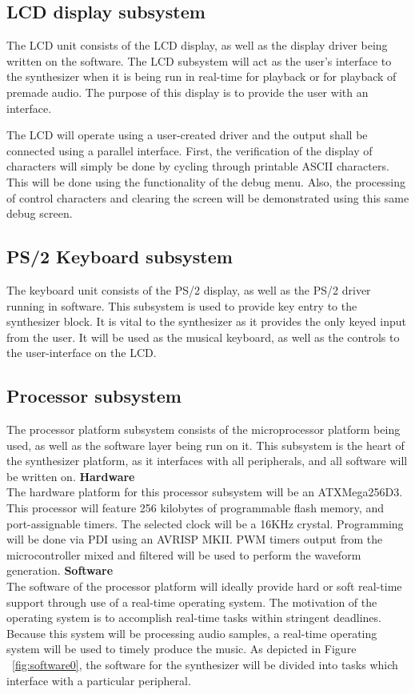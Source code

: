 \documentclass[bibtotocnumbered,abstract=on,paper=a4,fontsize=12pt,parskip=on,halfparskip=on]{scrartcl}		%
\begin{document}
  \subsection{LCD display subsystem}
    The LCD unit consists of the LCD display, as well as the display driver being written on the software. The LCD subsystem will act as the user's interface to the synthesizer when it is being run in real-time for playback or for playback of premade audio. The purpose of this display is to provide the user with an interface. 

    The LCD will operate using a user-created driver and the output shall be connected using a parallel interface. First, the verification of the display of characters will simply be done by cycling through printable ASCII characters. This will be done using the functionality of the debug menu. Also, the processing of control characters and clearing the screen will be demonstrated using this same debug screen.
  \subsection{PS/2 Keyboard subsystem}
    The keyboard unit consists of the PS/2 display, as well as the PS/2 driver running in software. This subsystem is used to provide key entry to the synthesizer block. It is vital to the synthesizer as it provides the only keyed input from the user. It will be used as the musical keyboard, as well as the controls to the user-interface on the LCD. 
  \subsection{Processor subsystem}
    The processor platform subsystem consists of the microprocessor platform being used, as well as the software layer being run on it. This subsystem is the heart of the synthesizer platform, as it interfaces with all peripherals, and all software will be written on. 
    \vskip 0.25cm
    \textbf{Hardware}\hfill \\
    The hardware platform for this processor subsystem will be an ATXMega256D3. This processor will feature 256 kilobytes of programmable flash memory, and port-assignable timers. The selected clock will be a 16KHz crystal. Programming will be done via PDI using an AVRISP MKII. PWM timers output from the microcontroller mixed and filtered will be used to perform the waveform generation.
    \vskip 0.25cm
    \textbf{Software}\hfill \\
    The software of the processor platform will ideally provide hard or soft real-time support through use of a real-time operating system. The motivation of the operating system is to accomplish real-time tasks within stringent deadlines. \cite{0595375979}Because this system will be processing audio samples, a real-time operating system will be used to timely produce the music. As depicted in Figure ~\ref{fig:software0}, the software for the synthesizer will be divided into tasks which interface with a particular peripheral.
\end{document}
